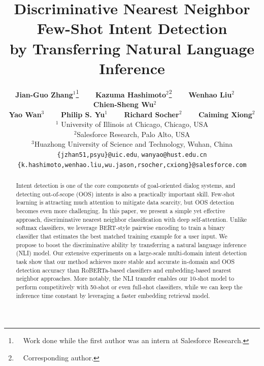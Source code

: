 \documentclass[11pt,a4paper]{article}
\title{Discriminative Nearest Neighbor Few-Shot Intent Detection\\ by Transferring Natural Language Inference}
\author{
  \textbf{Jian-Guo Zhang}$^1$\thanks{\ \ Work done while the first author was an intern at Salesforce Research.}~~~~ \textbf{Kazuma Hashimoto}$^2$\thanks{\ \ Corresponding author.}~~~~ \textbf{Wenhao Liu}$^2$~~~~ \textbf{Chien-Sheng Wu}$^2$~~~~  \\ \textbf{Yao Wan}$^3$~~~~ \textbf{Philip S. Yu}$^1$~~~~  \textbf{Richard Socher}$^2$~~~~ \textbf{Caiming Xiong}$^2$ \\
  $^1$ University of Illinois at Chicago, Chicago, USA \\
  $^2$Salesforce Research,  Palo Alto, USA \\
  $^3$Huazhong University of Science and Technology, Wuhan, China\\
  { \texttt{\{jzhan51,psyu\}@uic.edu}, \texttt{wanyao@hust.edu.cn} } \\
  { \texttt{\{{k.hashimoto,wenhao.liu,wu.jason,rsocher,cxiong\}@salesforce.com}} }
}
\date{}
\begin{document}
\maketitle
\begin{abstract}



Intent detection is one of the core components of goal-oriented dialog systems, and detecting out-of-scope (OOS) intents is also a practically important skill.
Few-shot learning is attracting much attention to mitigate data scarcity, but OOS detection becomes even more challenging.
In this paper, we present a simple yet effective approach, discriminative nearest neighbor classification with deep self-attention.
Unlike softmax classifiers, we leverage BERT-style pairwise encoding to train a binary classifier that estimates the best matched training example for a user input.
We propose to boost the discriminative ability by transferring a natural language inference (NLI) model.
Our extensive experiments on a large-scale multi-domain intent detection task show that our method achieves more stable and accurate in-domain and OOS detection accuracy than RoBERTa-based classifiers and embedding-based nearest neighbor approaches.
More notably, the NLI transfer enables our 10-shot model to perform competitively with 50-shot or even full-shot classifiers, while we can keep the inference time constant by leveraging a faster embedding retrieval model. 

\end{abstract}
\end{document}
